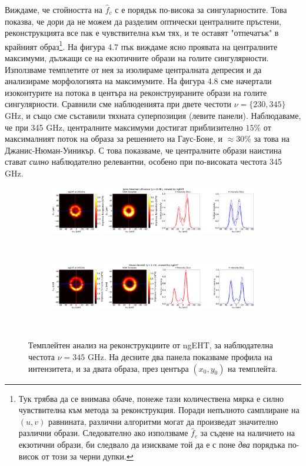 \documentclass[12pt]{article}
\numberwithin{equation}{section}
\numberwithin{figure}{section}
\begin{document}
	 \newpage
	Виждаме, че стойността на $\hat{f}_c$ с е порядък по-висока за сингуларностите. Това показва, че дори да не можем да разделим оптически централните пръстени, реконструкцията все пак е чувствителна към тях, и те оставят "отпечатък" в крайният образ\footnote{Тук трябва да се внимава обаче, понеже тази количествена мярка е силно чувствителна към метода за реконструкция. Поради непълното самплиране на $(u,v)$ равнината, различни алгоритми могат да произведат значително различни образи. Следователно ако използваме $\hat{f}_c$  за съдене на наличието на екзотични образи, би следвало да изискваме той да е с поне \emph{два} порядъка по-висок от този за черни дупки.}. На фигура 4.7 пък виждаме ясно проявата на централните максимуми, дължащи се на екзотичните образи на голите сингулярности. Използваме темплетите от нея за изолираме централната депресия и да анализираме морфологията на максимумите. На фигура 4.8 сме начертали изоконтурите на потока в центъра на реконструираните образи на голите сингулярности. Сравнили сме наблюденията при двете честоти $\nu = \{230, 345\}$ GHz, и също сме съставили тяхната суперпозиция (левите панели). Наблюдаваме, че при 345 GHz, централните максимуми достигат приблизително $15\%$ от максималният поток на образа за решението на Гаус-Боне, и $\approx 30\%$ за това на Джанис-Нюман-Уиникър. С това показваме, че централните образи наистина стават \emph{силно} наблюдателно релевантни, особено при по-високата честота 345 GHz. 
	 
	 \begin{figure}[h!]
	 	\centering
	 	\begin{subfigure}{12cm}
	 		\hspace{-1.5cm}
	 		\includegraphics[scale = 0.13]{Section_8_Observing_Horizonless_Objects/Ehtim_Vida_plot_ngEHT_345_JNW.png}
	 	\end{subfigure}\\
	 	\begin{subfigure}{12cm}
	 		\hspace{-1.5cm}
	 		\includegraphics[scale = 0.13]{Section_8_Observing_Horizonless_Objects/Ehtim_Vida_plot_ngEHT_345_GB.png}
	 	\end{subfigure}\\
	 	\label{VIDA_ngEHT_230}
	 	\caption[Темплейтен анализ на реконструкциите от ngEHT за $\nu= 345$ GHz]{\small Темплейтен анализ на реконструкциите от ngEHT, за наблюдателна честота $\nu = 345$ GHz. На десните два панела показваме профила на интензитета, и за двата образа, през центъра $(x_0,y_0)$ на темплейта.} 
	 \end{figure}
	 
\end{document}
